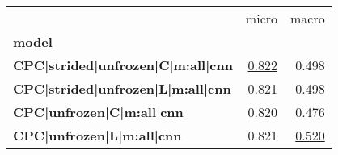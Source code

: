 \begin{adjustbox}{width=\textwidth}
\begin{tabular}{lrr}
\toprule
{} &  micro &  macro \\
\textbf{model                                         } &        &        \\
\midrule
\textbf{CPC|strided|unfrozen|C|m:all|cnn} &  \underline{0.822} &  0.498 \\
\textbf{CPC|strided|unfrozen|L|m:all|cnn} &  0.821 &  0.498 \\
\textbf{CPC|unfrozen|C|m:all|cnn        } &  0.820 &  0.476 \\
\textbf{CPC|unfrozen|L|m:all|cnn        } &  0.821 &  \underline{0.520} \\
\bottomrule
\end{tabular}
\end{adjustbox}